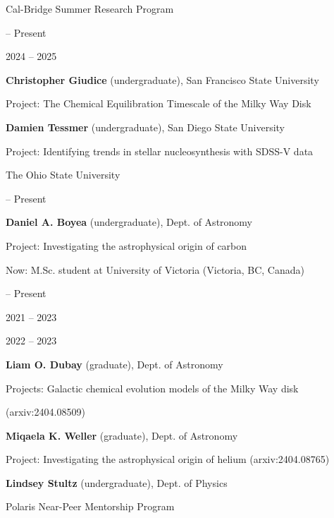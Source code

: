 \documentclass[cv.tex]{subfiles}
\begin{document}
{\color{themecolor} \large Cal-Bridge Summer Research Program}
\par\noindent
\parbox{0.18\textwidth}{%
	 -- Present \par
	\null \par
	2024 -- 2025 \par
	\null \par
}
\hspace{1mm}
\parbox{0.8\textwidth}{%
	\vspace{1mm}
	\textbf{Christopher Giudice} (undergraduate), San Francisco State University \par
	Project: The Chemical Equilibration Timescale of the Milky Way Disk \par
	\textbf{Damien Tessmer} (undergraduate), San Diego State University \par
	Project: Identifying trends in stellar nucleosynthesis with SDSS-V data \par
}

\vspace{3mm}
\noindent
{\color{themecolor} \large The Ohio State University}
\par\noindent
\parbox{0.18\textwidth}{%
	 -- Present \par
	\null \par
	\null \par
}
\hspace{1mm}
\parbox{0.8\textwidth}{%
	\vspace{1mm}
	\textbf{Daniel A. Boyea} (undergraduate), Dept. of Astronomy \par
	Project: Investigating the astrophysical origin of carbon \par
	Now: M.Sc. student at University of Victoria (Victoria, BC, Canada) \par
}

\noindent
\parbox{0.18\textwidth}{%
	 -- Present \par
	\null \par
	\null \par
	2021 -- 2023 \par
	\null \par
	2022 -- 2023 \par
	\null
}
\hspace{1mm}
\parbox{0.8\textwidth}{%
	\vspace{1mm}
	\textbf{Liam O. Dubay} (graduate), Dept. of Astronomy \par
	Projects: Galactic chemical evolution models of the Milky Way disk \par
	(arxiv:2404.08509) \par
	\textbf{Miqaela K. Weller} (graduate), Dept. of Astronomy \par
	Project: Investigating the astrophysical origin of helium
	(arxiv:2404.08765) \par
	\textbf{Lindsey Stultz} (undergraduate), Dept. of Physics \par
	Polaris Near-Peer Mentorship Program
}
\end{document}

